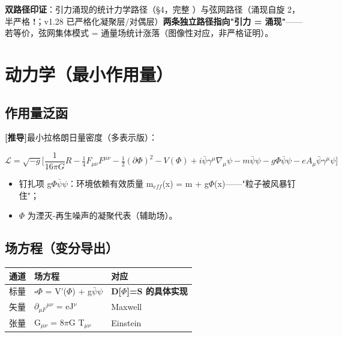 \documentclass[UTF8,fontset=windows]{csoarticle}
\newcommand{\mtag}[1]{\textbf{[#1]}}
\newcommand{\up}[1]{\ensuremath{^{#1}}}
\newcommand{\down}[1]{\ensuremath{_{#1}}}
\begin{document}
\begin{itemize}
\end{itemize}

\textbf{双路径印证}：引力涌现的统计力学路径（\S{}4，完整 \checkmark）与弦网路径（涌现自旋 2，半严格 \textbf{!}；v1.28 已严格化凝聚层/对偶层）\textbf{两条独立路径指向"引力 = 涌现"}------若等价，弦网集体模式 = 通量场统计涨落（图像性对应，非严格证明）。



\section{动力学（最小作用量）}

\subsection{作用量泛函}

\mtag{推导}最小拉格朗日量密度（多表示版）：

\[\mathcal{L} = \sqrt{-g}\Big[\frac{1}{16\pi G}R - \tfrac14 F_{\mu\nu}F^{\mu\nu} - \tfrac12(\partial\Phi)^2 - V(\Phi) + i\bar\psi\gamma^\mu\nabla_\mu\psi - m\bar\psi\psi - g\Phi\bar\psi\psi - eA_\mu\bar\psi\gamma^\mu\psi\Big]\]

\begin{itemize}
\item 钉扎项 g\ensuremath{\Phi}\ensuremath{\bar{\psi}}\ensuremath{\psi}：环境依赖有效质量 m\down{eff}(x) = m + g\ensuremath{\Phi}(x)------"粒子被风暴钉住"；
\item \ensuremath{\Phi} 为湮灭-再生噪声的凝聚代表（辅助场）。
\end{itemize}

\subsection{场方程（变分导出）}

\begin{table}[htbp]
\centering
\small
\begin{tabularx}{\textwidth}{@{}lXX@{}}
\toprule
通道 & 场方程 & 对应 \\
\midrule
标量 & \ensuremath{\square}\ensuremath{\Phi} = V'(\ensuremath{\Phi}) + g\ensuremath{\bar{\psi}}\ensuremath{\psi} & \textbf{D[\ensuremath{\Phi}]=S 的具体实现} \\
矢量 & \ensuremath{\partial}\down{\mu{}F}\up{\mu{}\nu{}} = eJ\up{\nu{}} & Maxwell \\
张量 & G\down{\mu{}\nu{}} = 8\ensuremath{\pi}G T\down{\mu{}\nu{}} & Einstein \\
\bottomrule
\end{tabularx}
\end{table}
\end{document}
